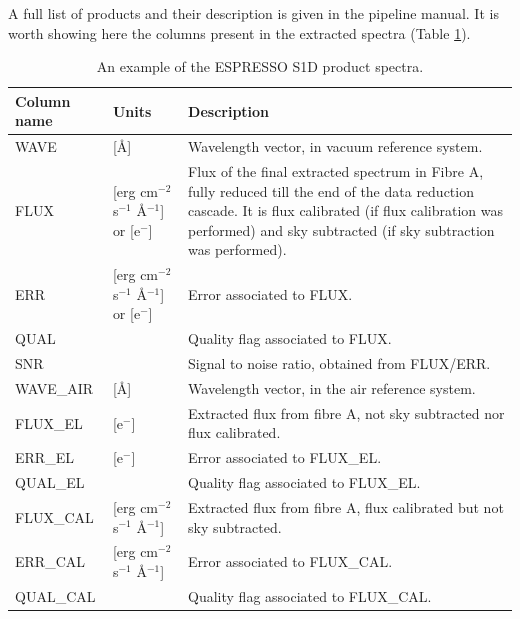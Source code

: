 A full list of products and their description is given in the pipeline
manual. It is worth showing here the columns present in the extracted
spectra (Table \ref{tab:s1d_product}).

\begin{table}[htbp]
\centering
\caption{An example of the ESPRESSO S1D product spectra.}
\label{tab:s1d_product}
\small
\begin{tabular}{|l|l|p{9cm}|}
\hline
\textbf{Column name} & \textbf{Units} & \textbf{Description} \\
\hline
WAVE & [\AA] &
Wavelength vector, in vacuum reference system. \\
\hline

FLUX & [erg cm$^{-2}$ s$^{-1}$ \AA$^{-1}$] or [e$^{-}$] &
Flux of the final extracted spectrum in Fibre A, fully reduced till the end of the data reduction cascade. It is flux calibrated (if flux calibration was performed) and sky subtracted (if sky subtraction was performed). \\
\hline

ERR & [erg cm$^{-2}$ s$^{-1}$ \AA$^{-1}$] or [e$^{-}$] &
Error associated to FLUX. \\
\hline

QUAL & &
Quality flag associated to FLUX. \\
\hline

SNR & &
Signal to noise ratio, obtained from FLUX/ERR. \\
\hline

WAVE\_AIR & [\AA] &
Wavelength vector, in the air reference system. \\
\hline

FLUX\_EL & [e$^{-}$] &
Extracted flux from fibre A, not sky subtracted nor flux calibrated. \\
\hline

ERR\_EL & [e$^{-}$] &
Error associated to FLUX\_EL. \\
\hline

QUAL\_EL & &
Quality flag associated to FLUX\_EL. \\
\hline

FLUX\_CAL & [erg cm$^{-2}$ s$^{-1}$ \AA$^{-1}$] &
Extracted flux from fibre A, flux calibrated but not sky subtracted. \\
\hline

ERR\_CAL & [erg cm$^{-2}$ s$^{-1}$ \AA$^{-1}$] &
Error associated to FLUX\_CAL. \\
\hline

QUAL\_CAL & &
Quality flag associated to FLUX\_CAL. \\
\hline


\end{tabular}
\end{table}
